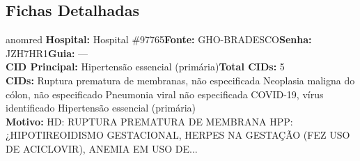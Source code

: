 \documentclass[a4paper,10pt]{article}
\begin{document}
\subsection{Fichas Detalhadas}
\begin{anomalycard}[Interna\c{c}\~{a}o \#117926 | Pac. \#97854 | CR\'{I}TICO (z=11.86) | LOS: 4d | 21/02/2026\,$\to$\,25/02/2026]{anomred}
\textbf{Hospital:} Hospital \#97765\quad \textbf{Fonte:} GHO-BRADESCO\quad \textbf{Senha:} JZH7HR1\quad \textbf{Guia:} ---\\

\textbf{CID Principal:} {\small Hipertensão essencial (primária)}\quad\textbf{Total CIDs:} 5\\

\textbf{CIDs:} {\scriptsize Ruptura prematura de membranas, não especificada \textbar{} Neoplasia maligna do cólon, não especificado \textbar{} Pneumonia viral não especificada \textbar{} COVID-19, vírus identificado \textbar{} Hipertensão essencial (primária)}\\

\textbf{Motivo:} {\scriptsize HD: RUPTURA PREMATURA DE MEMBRANA  HPP:¿HIPOTIREOIDISMO GESTACIONAL,  HERPES NA GESTAÇÃO (FEZ USO DE ACICLOVIR), ANEMIA EM USO DE...}\\




\end{anomalycard}
\end{document}

